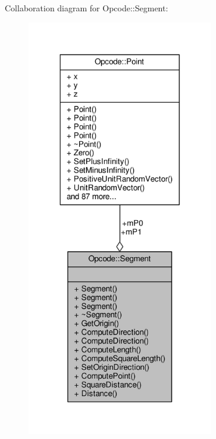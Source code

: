 Collaboration diagram for Opcode\+:\+:Segment\+:
\nopagebreak
\begin{figure}[H]
\begin{center}
\leavevmode
\includegraphics[width=230pt]{dd/d27/classOpcode_1_1Segment__coll__graph}
\end{center}
\end{figure}
